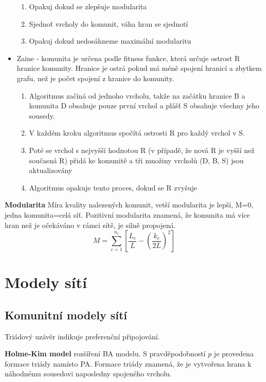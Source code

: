\documentclass[a4paper,12pt]{article}
\begin{document}
\begin{itemize}
\begin{enumerate}
        \item Opakuj dokud se zlepšuje modularita
        \item Sjednoť vrcholy do komunit, váha hran se sjednotí
        \item Opakuj dokud nedosáhneme maximální modularitu
    \end{enumerate}
    \item Zaine - komunita je určena podle fitness funkce, která určuje ostrost R hranice komunity. Hranice je ostrá pokud má méně spojení hranicí a zbytkem grafu, než je počet spojení z hranice do komunity.
        \begin{enumerate}
            \item Algoritmus začíná od jednoho vrcholu, takže na začátku hranice B a komunita D obsahuje pouze první vrchol a plášť S obsahuje všechny jeho sousedy.
            \item V každém kroku algoritmus spočítá ostrosti R pro každý vrchol v S. 
            \item Poté se vrchol s nejvyšší hodnotou R (v případě, že nová R je vyšší než současná R) přidá ke komunitě a tři množiny vrcholů (D, B, S) jsou aktualizovány
            \item Algoritmus opakuje tento proces, dokud se R zvyšuje
        \end{enumerate}
\end{itemize}

\textbf{Modularita}
Míra kvality nalezených komunit, vetší modularita je lepší, M=0, jedna komunita=celá síť. Pozitivní modularita znamená, že komunita má více hran než je očekáváno v rámci 
sítě, je silně propojená.
\begin{equation*}
    M = \sum_{c=1}^{n_c}\left[ \frac{L_c}{L} - \left( \frac{k_c}{2L} \right)^2 \right]
\end{equation*}


\section{Modely sítí}

\subsection{Komunitní modely sítí}
Triádový uzávěr indikuje preferenční připojování.

\textbf{Holme-Kim model} rozšíření BA modelu. S pravděpodobností $p$ je provedena formace triády namísto PA. Formace triády znamená, že je vytvořena hrana k 
náhodnému sousedovi naposledny spojeného vrcholu.
\end{document}
